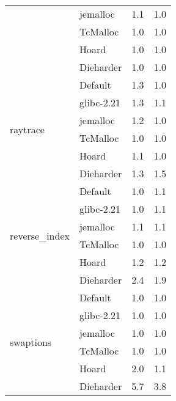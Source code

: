 \begin{table}[]
\begin{tabular}{|l|l|l|l|}
                                & jemalloc   & 1.1  & 1.0        \\ \cline{2-4} 
                                & TcMalloc   & 1.0  & 1.0        \\ \cline{2-4} 
                                & Hoard      & 1.0  & 1.0        \\ \cline{2-4} 
                                & Dieharder  & 1.0  & 1.0        \\ \hline
\multirow{6}{*}{raytrace}       & Default    & 1.3  & 1.0        \\ \cline{2-4} 
                                & glibc-2.21 & 1.3  & 1.1        \\ \cline{2-4} 
                                & jemalloc   & 1.2  & 1.0        \\ \cline{2-4} 
                                & TcMalloc   & 1.0  & 1.0        \\ \cline{2-4} 
                                & Hoard      & 1.1  & 1.0        \\ \cline{2-4} 
                                & Dieharder  & 1.3  & 1.5        \\ \hline
\multirow{6}{*}{reverse\_index} & Default    & 1.0  & 1.1        \\ \cline{2-4} 
                                & glibc-2.21 & 1.0  & 1.1        \\ \cline{2-4} 
                                & jemalloc   & 1.1  & 1.1        \\ \cline{2-4} 
                                & TcMalloc   & 1.0  & 1.0        \\ \cline{2-4} 
                                & Hoard      & 1.2  & 1.2        \\ \cline{2-4} 
                                & Dieharder  & 2.4  & 1.9        \\ \hline
\multirow{6}{*}{swaptions}      & Default    & 1.0  & 1.0        \\ \cline{2-4} 
                                & glibc-2.21 & 1.0  & 1.0        \\ \cline{2-4} 
                                & jemalloc   & 1.0  & 1.0        \\ \cline{2-4} 
                                & TcMalloc   & 1.0  & 1.0        \\ \cline{2-4} 
                                & Hoard      & 2.0  & 1.1        \\ \cline{2-4} 
                                & Dieharder  & 5.7  & 3.8        \\ \hline
\end{tabular}
\end{table}